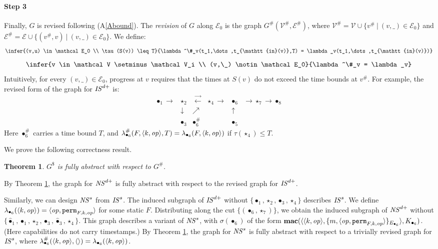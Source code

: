 \documentclass[10pt]{article}
\newtheorem{theorem}{Theorem}
\newcommand{\In}{\mathtt{in}}
\newcommand{\func}[1]{{\bf #1}}
\newcommand{\op}{{\it op}}
\newcommand{\tup}[1]{\langle #1\rangle}
\newcommand{\pisymbol}{\sigma}
\newcommand{\longrightleftarrows}{\overrightarrow\longleftarrow~~}
\begin{document}
\paragraph{Step 3} Finally, $G$ is revised following (A\ref{Abound}). The \emph{revision} of $G$ along $\mathcal E_0$ is the graph $G^\#(\mathcal V^\#,\mathcal E^\#)$, where $\mathcal V^\# = \mathcal V \cup \{v^\#~|~(v,\_) \in \mathcal E_0\}$ and $\mathcal E^\# = \mathcal E \cup \{(v^\#,v)~|~(v,\_) \in \mathcal E_0\}$. We define:
$$\infer{(v,u) \in \mathcal E_0 \\ \tau(S(v)) \leq T}
{\lambda^\#_v(t_1,\dots,t_{\In(v)},T) = \lambda_v(t_1,\dots,t_{\In(v)})}$$
$$\infer{v \in \mathcal V \setminus \mathcal V_i \\ (v,\_) \notin \mathcal E_0}{\lambda^\#_v = \lambda_v}$$
Intuitively, for every $(v,\_) \in \mathcal E_0$, progress at $v$ requires that the times at $S(v)$ do not exceed the time bounds at $v^\#$. For example, the revised form of the graph for ${\it IS}^{d+}$ is: 
\[
\left.
\begin{array}{lcrcr}
\bullet_1 \longrightarrow & \star_2 & \longrightleftarrows \star_4 \longrightarrow \!\!& \bullet_6 & \longrightarrow \star_7 \longrightarrow \bullet_8\\
& \downarrow & \nearrow\!\! & \uparrow\\
& \bullet_3 & \bullet_6^\#~~~~& \bullet_5
\end{array}
\right.
\]
Here $\bullet_6^\#$ carries a time bound $T$, and $\lambda^\#_{\bullet_6}(F,\tup{k,\op},T) = \lambda_{\bullet_6}(F,\tup{k,\op})$ if $\tau(\star_4) \leq T$. 

We prove the following correctness result.
\begin{theorem}\label{thm:general} $G^\$$ is fully abstract with respect to $G^\#$.
\end{theorem}
\noindent
By Theorem \ref{thm:general}, the graph for ${\it NS}^{d+}$ is fully abstract with respect to the revised graph for ${\it IS}^{d+}$. 

Similarly, we can design ${\it NS}^s$ from ${\it IS}^s$. The induced subgraph of ${\it IS}^{d+}$ without $\{\bullet_1,\star_2,\bullet_3,\star_4\}$ describes ${\it IS}^s$. We define $\lambda_{\bullet_6}(\tup{k,\op}) = \tup{\op,\mathtt{perm}_{F,k,\op}}$ for some static $F$. Distributing along the cut $\{(\bullet_6,\star_7)\}$, we obtain the induced subgraph of ${\it NS}^{d+}$ without $\{\hat\bullet_1,\bullet_1,\star_2,\bullet_3,\hat\bullet_3,\star_4\}$. 
This graph describes a variant of ${\it NS}^s$, with $\pisymbol(\bullet_6)$ of the form $\func{mac}(\tup{\tup{k,\op},\{m,\tup{\op,\mathtt{perm}_{F,k,\op}}\}_{E_{\bullet_6}}},K_{\bullet_6})$. (Here capabilities do not carry timestamps.) By Theorem \ref{thm:general}, the graph for ${\it NS}^s$ is fully abstract with respect to a trivially revised graph for ${\it IS}^s$, where $\lambda^\#_{\bullet_6}(\tup{k,\op},\tup{}) = \lambda_{\bullet_6}(\tup{k,\op})$.
\end{document}
